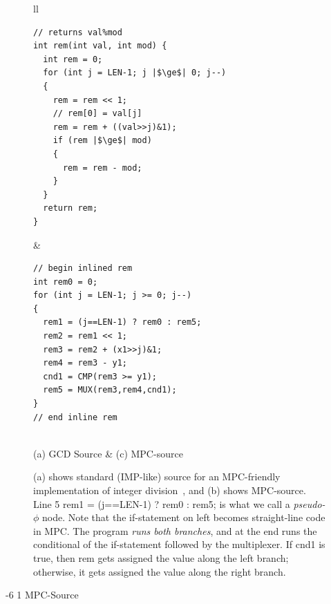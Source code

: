 \documentclass[sigconf, screen, natbib=false, dvipsnames, table]{acmart}
\makeatletter
\renewcommand{\subsubsection}{\@startsection{subsubsection}{3}{\z@}%
                        {-6\p@ \@plus -4\p@ \@minus -4\p@}%
                        {1\p@ \@plus 1\p@ \@minus 0\p@}%
                        {\normalfont\normalsize\bfseries\boldmath}}
\theoremstyle{definition}
\makeatother
\begin{document}
\begin{figure}[tbhp]
\begin{tabular}{ll}
\begin{minipage}[b]{4.25cm}

\begin{verbatim}
// returns val%mod    
int rem(int val, int mod) {
  int rem = 0;
  for (int j = LEN-1; j |$\ge$| 0; j--) 
  {
    rem = rem << 1;
    // rem[0] = val[j]                                                                                                            
    rem = rem + ((val>>j)&1);   
    if (rem |$\ge$| mod) 
    {
      rem = rem - mod;
    }
  }    
  return rem;
}
\end{verbatim}
\end{minipage} 

&

\begin{minipage}[b]{4.25cm}
\begin{verbatim}
// begin inlined rem
int rem0 = 0;
for (int j = LEN-1; j >= 0; j--) 
{
  rem1 = (j==LEN-1) ? rem0 : rem5;
  rem2 = rem1 << 1;
  rem3 = rem2 + (x1>>j)&1; 
  rem4 = rem3 - y1;
  cnd1 = CMP(rem3 >= y1);
  rem5 = MUX(rem3,rem4,cnd1);
}  
// end inline rem        
\end{verbatim}
\end{minipage}
\\

(a) GCD Source 
&
(c) MPC-source

\end{tabular}
\caption{(a) shows standard (IMP-like) source for an MPC-friendly implementation 
of integer division~\cite{Demmler}, and (b) shows MPC-source. Line 5 {\sf rem1 = (j==LEN-1) ? rem0 : rem5;} 
is what we call a {\em pseudo-$\phi$} node. Note that the {\sf if}-statement on left
becomes straight-line code in MPC. The program \emph{runs both branches}, and 
at the end runs the conditional of the if-statement followed by the multiplexer. 
If {\sf cnd1} is {\sf true}, then {\sf rem} gets assigned the value along the left branch;
otherwise, it gets assigned the value along the right branch.}
    \label{fig:example}\vspace{-2ex}
\end{figure}


\subsubsection{MPC-Source} 
\end{document}
